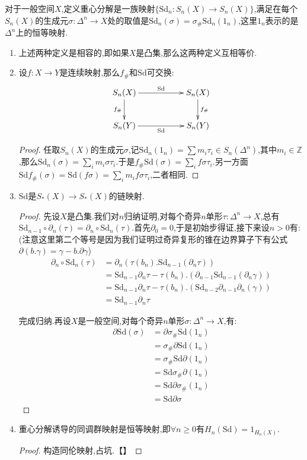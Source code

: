 对于一般空间$X$,定义重心分解是一族映射$\{\mathrm{Sd}_n:S_n(X)\to S_n(X)\}$,满足在每个$S_n(X)$的生成元$\sigma:\Delta^n\to X$处的取值是$\mathrm{Sd}_n(\sigma)=\sigma_{\#}\mathrm{Sd}_n(1_n)$,这里$1_n$表示的是$\Delta^n$上的恒等映射.
\begin{enumerate}
	\item 上述两种定义是相容的,即如果$X$是凸集,那么这两种定义互相等价.
	\item 设$f:X\to Y$是连续映射,那么$f_{\#}$和$\mathrm{Sd}$可交换:
	$$\xymatrix{S_n(X)\ar[rr]^{\mathrm{Sd}}\ar[d]_{f_{\#}}&&S_n(X)\ar[d]^{f_{\#}}\\S_n(Y)\ar[rr]_{\mathrm{Sd}}&&S_n(Y)}$$
	\begin{proof}
		
		任取$S_n(X)$的生成元$\sigma$,记$\mathrm{Sd}_n(1_n)=\sum m_i\tau_i\in S_n(\Delta^n)$,其中$m_i\in\mathbb{Z}$,那么$\mathrm{Sd}_n(\sigma)=\sum_im_i\sigma\tau_i$.于是$f_{\#}\mathrm{Sd}(\sigma)=\sum_if\sigma\tau_i$.另一方面$\mathrm{Sd}f_{\#}(\sigma)=\mathrm{Sd}(f\sigma)=\sum_im_if\sigma\tau_i$,二者相同.
	\end{proof}
	\item $\mathrm{Sd}$是$S_*(X)\to S_*(X)$的链映射.
	\begin{proof}
		
		先设$X$是凸集.我们对$n$归纳证明,对每个奇异$n$单形$\tau:\Delta^n\to X$,总有$\mathrm{Sd}_{n-1}\circ\partial_n(\tau)=\partial_n\circ\mathrm{Sd}_n(\tau)$.首先$\partial_0=0$,于是初始步得证,接下来设$n>0$有:(注意这里第二个等号是因为我们证明过奇异复形的锥在边界算子下有公式$\partial(b.\gamma)=\gamma-b.\partial\gamma$)
		\begin{align*}
		\partial_n\circ\mathrm{Sd}_n(\tau)&=\partial_n(\tau(b_n).\mathrm{Sd}_{n-1}(\partial_n\tau))\\
		&=\mathrm{Sd}_{n-1}\partial_n\tau-\tau(b_n).(\partial_{n-1}\mathrm{Sd}_{n-1}(\partial_n\gamma))\\
		&=\mathrm{Sd}_{n-1}\partial_n\tau-\tau(b_n).(\mathrm{Sd}_{n-2}\partial_{n-1}\partial_n(\gamma))\\
		&=\mathrm{Sd}_{n-1}\partial_n\tau
		\end{align*}
		
		完成归纳.再设$X$是一般空间,对每个奇异$n$单形$\sigma:\Delta^n\to X$,有:
		\begin{align*}
		\partial\mathrm{Sd}(\sigma)&=\partial\sigma_{\#}\mathrm{Sd}(1_n)\\
		&=\sigma_{\#}\partial\mathrm{Sd}(1_n)\\&=\sigma_{\#}\mathrm{Sd}\partial(1_n)\\&=\mathrm{Sd}\sigma_{\#}\partial(1_n)\\&=\mathrm{Sd}\partial\sigma_{\#}(1_n)\\&=\mathrm{Sd}\partial\sigma
		\end{align*}		
	\end{proof}
	\item 重心分解诱导的同调群映射是恒等映射,即$\forall n\ge0$有$H_n(\mathrm{Sd})=1_{H_n(X)}$.
	\begin{proof}
		
		构造同伦映射,占坑.【】
	\end{proof}
\end{enumerate}

